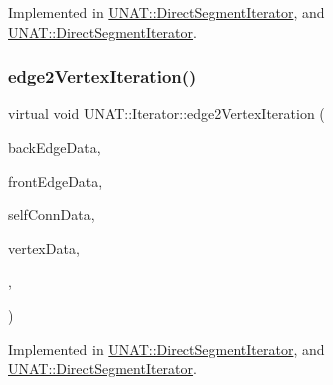 Implemented in \mbox{\hyperlink{classUNAT_1_1DirectSegmentIterator_a4b4de063d998f54f092a3ca779fd818f}{U\+N\+A\+T\+::\+Direct\+Segment\+Iterator}}, and \mbox{\hyperlink{classUNAT_1_1DirectSegmentIterator_af7c69ced9c4c68aab3f8be3bdbbb39c4}{U\+N\+A\+T\+::\+Direct\+Segment\+Iterator}}.

\mbox{\label{classUNAT_1_1Iterator_a59fb9d4c251dd0456078decabf332399}} 
\subsubsection{\texorpdfstring{edge2VertexIteration()}{edge2VertexIteration()}\hspace{0.1cm}{\footnotesize\ttfamily [2/2]}}
{\footnotesize\ttfamily virtual void U\+N\+A\+T\+::\+Iterator\+::edge2\+Vertex\+Iteration (\begin{DoxyParamCaption}\item[{\mbox{\hyperlink{structArrays}{Arrays}} $\ast$}]{back\+Edge\+Data,  }\item[{\mbox{\hyperlink{structArrays}{Arrays}} $\ast$}]{front\+Edge\+Data,  }\item[{\mbox{\hyperlink{structArrays}{Arrays}} $\ast$}]{self\+Conn\+Data,  }\item[{\mbox{\hyperlink{structArrays}{Arrays}} $\ast$}]{vertex\+Data,  }\item[{\mbox{\hyperlink{test_2directSegment_2iterator_8h_ae588e578b6781906a44208130df0ab29}{e2v\+\_\+host\+Fun\+Ptr}}}]{,  }\item[{\mbox{\hyperlink{test_2directSegment_2iterator_8h_a7b58029f74760f3ca5384034c0e89c15}{e2v\+\_\+slave\+Fun\+Ptr}}}]{ }\end{DoxyParamCaption})\hspace{0.3cm}{\ttfamily [pure virtual]}}



Implemented in \mbox{\hyperlink{classUNAT_1_1DirectSegmentIterator_a4b4de063d998f54f092a3ca779fd818f}{U\+N\+A\+T\+::\+Direct\+Segment\+Iterator}}, and \mbox{\hyperlink{classUNAT_1_1DirectSegmentIterator_af7c69ced9c4c68aab3f8be3bdbbb39c4}{U\+N\+A\+T\+::\+Direct\+Segment\+Iterator}}.

\mbox{\label{classUNAT_1_1Iterator_ac5ce1cbee8e78efc52ba25d3da9eb9c8}} 
